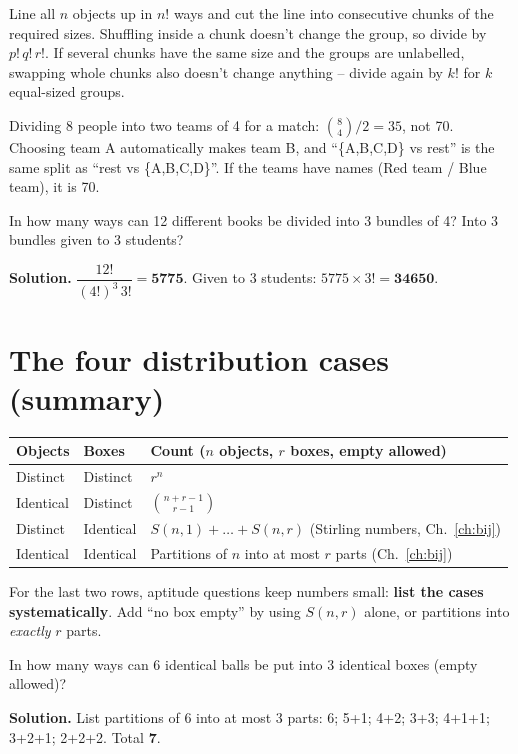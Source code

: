 \documentclass[11pt,a4paper,openany]{report}
\newcommand{\C}[2]{\binom{#1}{#2}}
\begin{document}
\begin{why}
Line all $n$ objects up in $n!$ ways and cut the line into consecutive chunks of the required sizes.
Shuffling inside a chunk doesn't change the group, so divide by $p!\,q!\,r!$. If several chunks have the same
size and the groups are unlabelled, swapping whole chunks also doesn't change anything -- divide again by
$k!$ for $k$ equal-sized groups.
\end{why}

\begin{trap}
Dividing 8 people into two teams of 4 for a match: $\C84/2=35$, not 70. Choosing team A
automatically makes team B, and ``\{A,B,C,D\} vs rest'' is the same split as ``rest vs \{A,B,C,D\}''.
If the teams have names (Red team / Blue team), it is 70.
\end{trap}

\begin{example}
In how many ways can 12 different books be divided into 3 bundles of 4? Into 3 bundles given to 3 students?

\textbf{Solution.} $\dfrac{12!}{(4!)^3\,3!}=\mathbf{5775}$. Given to 3 students: $5775\times3!=\mathbf{34650}$.
\end{example}

\section{The four distribution cases (summary)}
\begin{center}
\begin{tabular}{lll}
\toprule
Objects & Boxes & Count ($n$ objects, $r$ boxes, empty allowed)\\
\midrule
Distinct & Distinct & $r^n$\\
Identical & Distinct & $\C{n+r-1}{r-1}$\\
Distinct & Identical & $S(n,1)+\dots+S(n,r)$ (Stirling numbers, Ch.~\ref{ch:bij})\\
Identical & Identical & Partitions of $n$ into at most $r$ parts (Ch.~\ref{ch:bij})\\
\bottomrule
\end{tabular}
\end{center}
For the last two rows, aptitude questions keep numbers small: \textbf{list the cases systematically}.
Add ``no box empty'' by using $S(n,r)$ alone, or partitions into \emph{exactly} $r$ parts.

\begin{example}
In how many ways can 6 identical balls be put into 3 identical boxes (empty allowed)?

\textbf{Solution.} List partitions of 6 into at most 3 parts:
6; 5+1; 4+2; 3+3; 4+1+1; 3+2+1; 2+2+2. Total $\mathbf{7}$.
\end{example}
\end{document}
